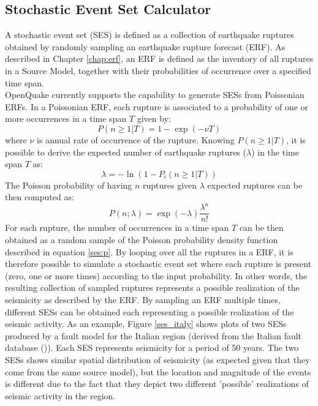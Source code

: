 \subsection{Stochastic Event Set Calculator}
A stochastic event set (SES) is defined as a collection of earthquake ruptures obtained by randomly sampling an earthquake rupture forecast (ERF). As described in Chapter \ref{chap:erf}, an ERF is defined as the inventory of all ruptures in a Source Model, together with their probabilities of occurrence over a specified time span.\\
OpenQuake currently supports the capability to generate SESs from Poissonian ERFs. In a Poissonian ERF, each rupture is associated to a probability of one or more occurrences in a time span $T$ given by:
\begin{equation}
P(n\geq1|T) = 1 - \exp(-\nu T)
\end{equation} 
where $\nu$ is annual rate of occurrence of the rupture. Knowing $P(n\geq1|T)$, it is possible to derive the expected number of earthquake ruptures ($\lambda$) in the time span $T$  as:
\begin{equation}
\lambda = - \ln(1 - P_{i}(n\geq1|T))
\end{equation} 
The Poisson probability of having $n$ ruptures given $\lambda$ expected ruptures can be then computed as:
\begin{equation}
P(n;\lambda) = \exp(-\lambda)\frac{\lambda^{n}}{n!}
\label{ses:p}
\end{equation}
For each rupture, the number of occurrences in a time span $T$ can be then obtained as a random sample of the Poisson probability density function described in equation \ref{ses:p}. By looping over all the ruptures in a ERF, it is therefore possible to simulate a stochastic event set where each rupture is present (zero, one or more times) according to the input probability. In other words, the resulting collection of sampled ruptures represents a possible realization of the seismicity as described by the ERF. By sampling an ERF multiple times, different SESs can be obtained each representing a possible realization of the seismic activity. As an example, Figure \ref{ses_italy} shows plots of two SESs produced by a fault model for the Italian region (derived from the Italian fault database (\cite{basili2008})). Each SES represents seismicity for a period of 50 years. The two SESs shows similar spatial distribution of seismicity (as expected given that they come from the same source model), but the location and magnitude of the events is different due to the fact that they depict two different 'possible' realizations of seismic activity in the region.\\
